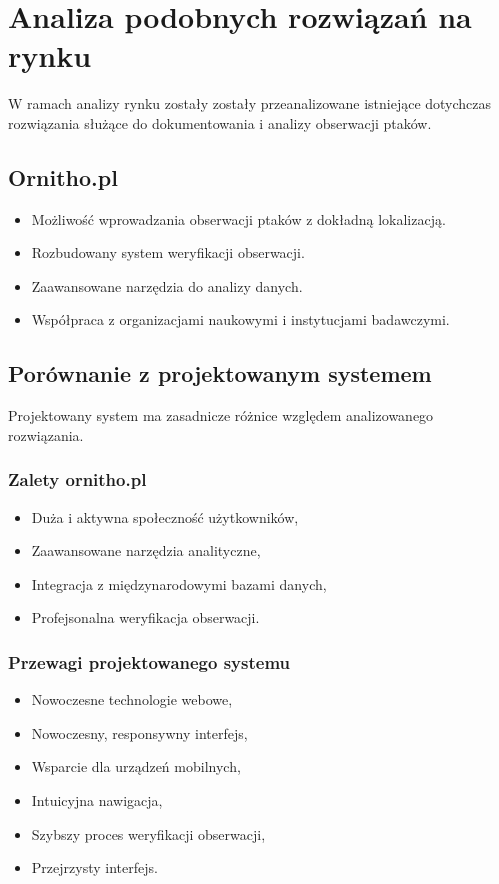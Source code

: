 \section{Analiza podobnych rozwiązań na rynku}

W ramach analizy rynku zostały zostały przeanalizowane istniejące dotychczas rozwiązania służące do dokumentowania i analizy obserwacji ptaków.

\subsection{Ornitho.pl}
\begin{itemize}
	\item Możliwość wprowadzania obserwacji ptaków z dokładną lokalizacją.
	\item Rozbudowany system weryfikacji obserwacji.
	\item Zaawansowane narzędzia do analizy danych.
	\item Współpraca z organizacjami naukowymi i instytucjami badawczymi.
\end{itemize}

\subsection{Porównanie z projektowanym systemem}
Projektowany system ma zasadnicze różnice względem analizowanego rozwiązania.

\subsubsection{Zalety ornitho.pl}
\begin{itemize}
	\item Duża i aktywna społeczność użytkowników,
	\item Zaawansowane narzędzia analityczne,
	\item Integracja z międzynarodowymi bazami danych,
	\item Profejsonalna weryfikacja obserwacji.
\end{itemize}

\subsubsection{Przewagi projektowanego systemu}
\begin{itemize}
	\item Nowoczesne technologie webowe,
	\item Nowoczesny, responsywny interfejs,
	\item Wsparcie dla urządzeń mobilnych,
	\item Intuicyjna nawigacja,
	\item Szybszy proces weryfikacji obserwacji,
	\item Przejrzysty interfejs.
\end{itemize}

